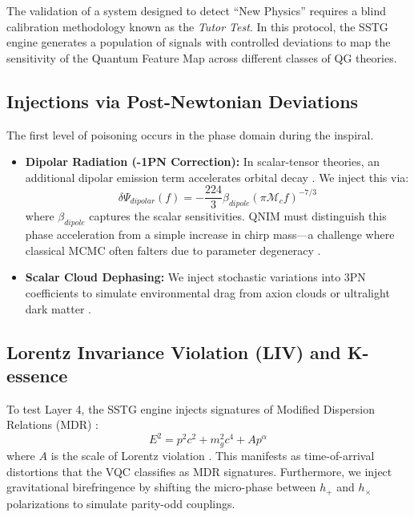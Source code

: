 \documentclass[11pt,a4paper,spanish]{book}
\numberwithin{equation}{chapter}
\numberwithin{figure}{chapter}
\numberwithin{equation}{chapter}
\numberwithin{figure}{chapter}
\numberwithin{table}{chapter}
\begin{document}
The validation of a system designed to detect ``New Physics'' requires a blind calibration methodology known as the \textit{Tutor Test}. In this protocol, the SSTG engine generates a population of signals with controlled deviations to map the sensitivity of the Quantum Feature Map across different classes of QG theories.

\subsection{Injections via Post-Newtonian Deviations}

The first level of poisoning occurs in the phase domain during the inspiral.
\begin{itemize}
    \item \textbf{Dipolar Radiation (-1PN Correction):} In scalar-tensor theories, an additional dipolar emission term accelerates orbital decay \cite{pmc_tests_gr}. We inject this via:
    \begin{equation}
        \delta\Psi_{dipolar}(f) = -\frac{224}{3} \beta_{dipole} (\pi \mathcal{M}_c f)^{-7/3}
    \end{equation}
    where $\beta_{dipole}$ captures the scalar sensitivities. QNIM must distinguish this phase acceleration from a simple increase in chirp mass—a challenge where classical MCMC often falters due to parameter degeneracy \cite{arxiv250113846}.
    \item \textbf{Scalar Cloud Dephasing:} We inject stochastic variations into 3PN coefficients to simulate environmental drag from axion clouds or ultralight dark matter \cite{arxiv_imprints_axions, researchgate_dephasing_astronomy}.
\end{itemize}

\subsection{Lorentz Invariance Violation (LIV) and K-essence}

To test Layer 4, the SSTG engine injects signatures of Modified Dispersion Relations (MDR) \cite{dspace_mit_mdr, arxiv_tests_gr_mdr}:
\begin{equation}
    E^2 = p^2c^2 + m_g^2c^4 + Ap^\alpha
\end{equation}
where $A$ is the scale of Lorentz violation \cite{cern_lorentz_violating, arxiv_propagation_lorentz}. This manifests as time-of-arrival distortions that the VQC classifies as MDR signatures. Furthermore, we inject gravitational birefringence by shifting the micro-phase between $h_+$ and $h_\times$ polarizations to simulate parity-odd couplings.
\end{document}

